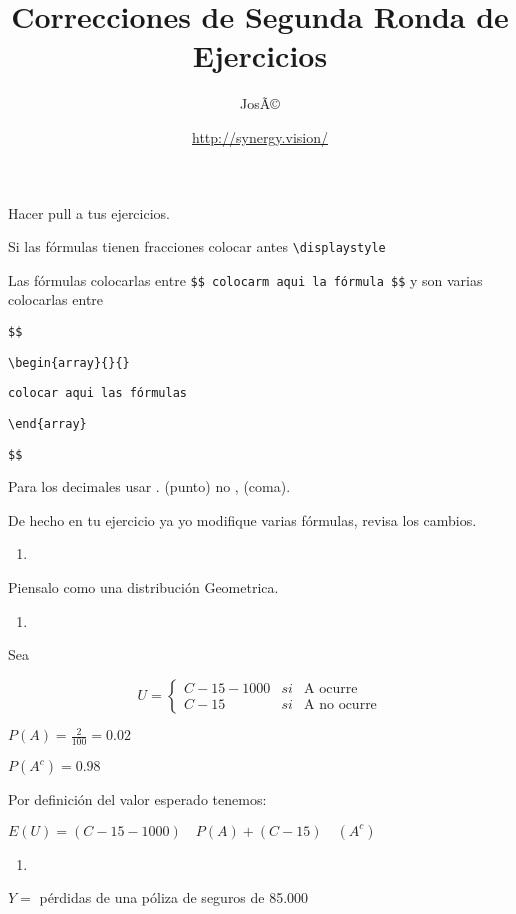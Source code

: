 \documentclass[12pt,]{article}
\title{Correcciones de Segunda Ronda de Ejercicios}
\subtitle{JosÃ©}
\author{\url{http://synergy.vision/}}
\date{}
\begin{document}
\maketitle

Hacer pull a tus ejercicios.

Si las fórmulas tienen fracciones colocar antes
\texttt{\textbackslash{}displaystyle}

Las fórmulas colocarlas entre
\texttt{\$\$\ colocarm\ aqui\ la\ fórmula\ \$\$} y son varias colocarlas
entre

\texttt{\$\$}

\texttt{\textbackslash{}begin\{array\}\{\}\{\}}

\texttt{colocar\ aqui\ las\ fórmulas}

\texttt{\textbackslash{}end\{array\}}

\texttt{\$\$}

Para los decimales usar . (punto) no , (coma).

De hecho en tu ejercicio ya yo modifique varias fórmulas, revisa los
cambios.

\begin{enumerate}
\def\labelenumi{\arabic{enumi}.}
\item
\end{enumerate}

Piensalo como una distribución Geometrica.

\begin{enumerate}
\def\labelenumi{\arabic{enumi}.}
\setcounter{enumi}{1}
\item
\end{enumerate}

Sea

\[
U=\left\{
\begin{matrix}
C-15-1000 & si & \text{A  ocurre}\\
C-15 & si & \text{A no ocurre}
\end{matrix}
\right .
\]

\(P(A)=\frac{2}{100}=0.02\)

\(P(A^c)=0.98\)

Por definición del valor esperado tenemos:

\(E(U)=(C-15-1000)\quad P(A)+(C-15)\quad (A^c)\)

\begin{enumerate}
\def\labelenumi{\arabic{enumi}.}
\setcounter{enumi}{2}
\item
\end{enumerate}

\(Y=\) pérdidas de una póliza de seguros de 85.000
\end{document}
